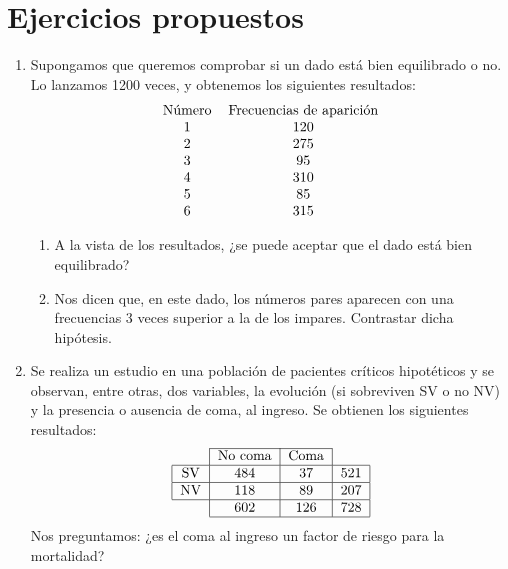 \section{Ejercicios propuestos}
\begin{enumerate}
\item Supongamos que queremos comprobar si un dado está bien equilibrado o no. Lo lanzamos 1200 veces, y obtenemos los siguientes
resultados:
\[
\begin{tabular}{ll}
\multicolumn{1}{c}{Número} & \multicolumn{1}{c}{Frecuencias de aparición} \\
\multicolumn{1}{c}{1} & \multicolumn{1}{c}{120} \\
\multicolumn{1}{c}{2} & \multicolumn{1}{c}{275} \\
\multicolumn{1}{c}{3} & \multicolumn{1}{c}{95} \\
\multicolumn{1}{c}{4} & \multicolumn{1}{c}{310} \\
\multicolumn{1}{c}{5} & \multicolumn{1}{c}{85} \\
\multicolumn{1}{c}{6} & \multicolumn{1}{c}{315} \\
\end{tabular}
\]
\begin{enumerate}
\item A la vista de los resultados, ¿se puede aceptar que el dado está bien equilibrado?
\item Nos dicen que, en este dado, los números pares aparecen con una frecuencias 3 veces superior a la de los impares. Contrastar dicha
hipótesis.
\end{enumerate}

\item Se realiza un estudio en una población de pacientes críticos hipotéticos y se observan, entre otras, dos variables, la evolución (si
sobreviven SV o no NV) y la presencia o ausencia de coma, al ingreso. Se obtienen los siguientes resultados:
\[
\begin{tabular}{l|l|l|l|}
\cline{2-3}
\multicolumn{1}{c|}{} & \multicolumn{1}{c|}{No coma} & \multicolumn{1}{c|}{Coma} & \multicolumn{1}{c}{} \\
\hline
\multicolumn{1}{|c|}{SV} & \multicolumn{1}{c|}{484} & \multicolumn{1}{c|}{37} & \multicolumn{1}{c|}{521} \\
\hline
\multicolumn{1}{|c|}{NV} & \multicolumn{1}{c|}{118} & \multicolumn{1}{c|}{89} & \multicolumn{1}{c|}{207} \\
\hline
\multicolumn{1}{c|}{} & \multicolumn{1}{c|}{602} & \multicolumn{1}{c|}{126} & \multicolumn{1}{c|}{728} \\
\cline{2-4}
\end{tabular}
\]
Nos preguntamos: ¿es el coma al ingreso un factor de riesgo para la mortalidad?


\end{enumerate}
